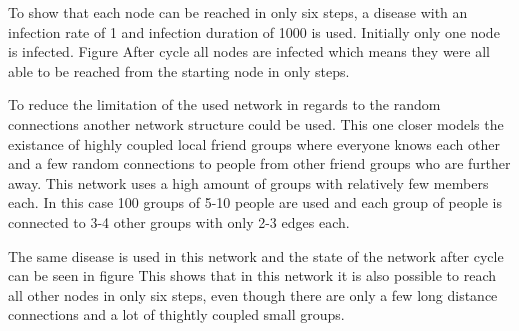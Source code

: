 To show that each node can be reached in only six steps, a disease with an infection rate
of 1 and infection duration of 1000 is used. Initially only one
node is infected. Figure %
After cycle %
all nodes are infected which means they were all able to be reached from the 
starting node in only %
steps.

To reduce the limitation of the used network in regards to the random connections another
network structure could be used. This one closer models the existance of highly coupled
local friend groups where everyone knows each other and a few random connections to people
from other friend groups who are further away. This network uses a high amount of
groups with relatively few members each. In this case 100 groups of 5-10 people are used
and each group of people is connected to 3-4 other groups with only 2-3 edges each.

The same disease is used in this network and the state of the network after cycle %
can be seen in figure %
This shows that in this network it is also possible to reach all other nodes in only six steps,
even though there are only a few long distance connections and a lot of thightly coupled
small groups.


